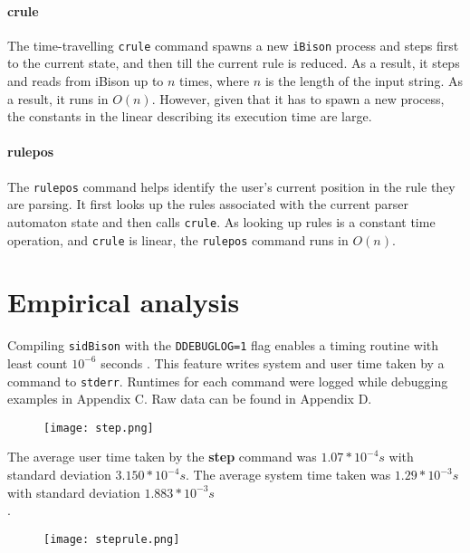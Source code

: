 \paragraph{crule}

The time-travelling \verb|crule| command spawns a new \verb|iBison| process and steps first to the current state, and then till the current rule is reduced. As a result, it steps and reads from iBison  up to $n$ times, where $n$ is the length of the input string. As a result, it runs in $O (n)$. However, given that it has to spawn a new process, the constants in the linear describing its execution time are large.

\paragraph{rulepos}

The \verb|rulepos| command helps identify the user's current position in the rule they are parsing. It first looks up the rules associated with the current parser automaton state and then calls \verb|crule|. As looking up rules is a constant time operation, and \verb|crule| is linear, the \verb|rulepos| command runs in $O(n)$.\\



\section{Empirical analysis}

Compiling \verb|sidBison| with the \verb|DDEBUGLOG=1| flag enables a timing routine with least count $10^{-6}$ seconds . This feature writes system and user time taken by a command to \verb|stderr|. Runtimes for each command were logged while debugging examples in Appendix C. Raw data can be found in Appendix D.



\begin{figure}[H] \centering
\texttt{[image: step.png]}
\end{figure}

\noindent

The average user time taken by the \textbf{step} command was $1.07*10^{-4}s$ with standard deviation $3.150 * 10^{-4} s$. The average system  time taken was $1.29*10^{-3} s$ with standard deviation $1.883 * 10^{-3} s$\\.


\begin{figure}[H] \centering
\texttt{[image: steprule.png]}
\label{fig:steprule}
\end{figure}

